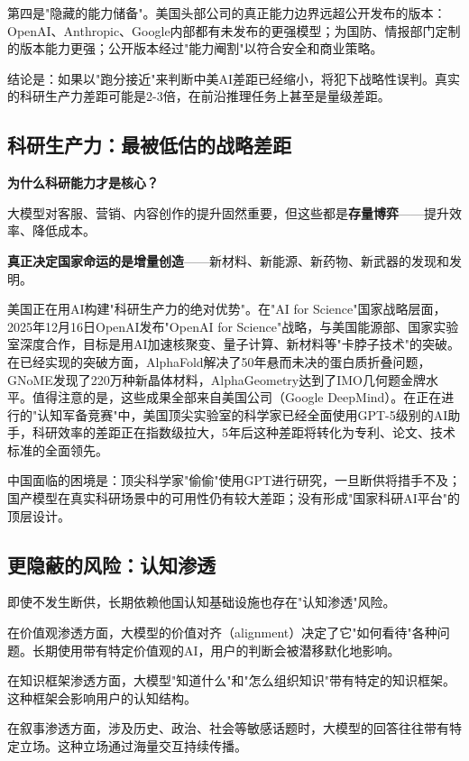 第四是"隐藏的能力储备"。美国头部公司的真正能力边界远超公开发布的版本：OpenAI、Anthropic、Google内部都有未发布的更强模型；为国防、情报部门定制的版本能力更强；公开版本经过"能力阉割"以符合安全和商业策略。

结论是：如果以"跑分接近"来判断中美AI差距已经缩小，将犯下战略性误判。真实的科研生产力差距可能是2-3倍，在前沿推理任务上甚至是量级差距。

\subsection{科研生产力：最被低估的战略差距}

\textbf{为什么科研能力才是核心？}

大模型对客服、营销、内容创作的提升固然重要，但这些都是\textbf{存量博弈}——提升效率、降低成本。

\textbf{真正决定国家命运的是增量创造}——新材料、新能源、新药物、新武器的发现和发明。

美国正在用AI构建"科研生产力的绝对优势"。在"AI for Science"国家战略层面，2025年12月16日OpenAI发布"OpenAI for Science"战略，与美国能源部、国家实验室深度合作，目标是用AI加速核聚变、量子计算、新材料等"卡脖子技术"的突破。在已经实现的突破方面，AlphaFold解决了50年悬而未决的蛋白质折叠问题，GNoME发现了220万种新晶体材料，AlphaGeometry达到了IMO几何题金牌水平。值得注意的是，这些成果全部来自美国公司（Google DeepMind）。在正在进行的"认知军备竞赛"中，美国顶尖实验室的科学家已经全面使用GPT-5级别的AI助手，科研效率的差距正在指数级拉大，5年后这种差距将转化为专利、论文、技术标准的全面领先。

中国面临的困境是：顶尖科学家"偷偷"使用GPT进行研究，一旦断供将措手不及；国产模型在真实科研场景中的可用性仍有较大差距；没有形成"国家科研AI平台"的顶层设计。

\subsection{更隐蔽的风险：认知渗透}

即使不发生断供，长期依赖他国认知基础设施也存在"认知渗透"风险。

在价值观渗透方面，大模型的价值对齐（alignment）决定了它"如何看待"各种问题。长期使用带有特定价值观的AI，用户的判断会被潜移默化地影响。

在知识框架渗透方面，大模型"知道什么"和"怎么组织知识"带有特定的知识框架。这种框架会影响用户的认知结构。

在叙事渗透方面，涉及历史、政治、社会等敏感话题时，大模型的回答往往带有特定立场。这种立场通过海量交互持续传播。

